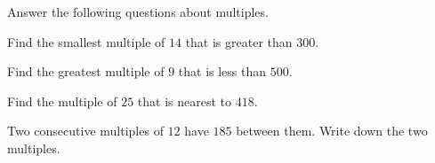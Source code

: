 Answer the following questions about multiples.
\begin{subparts}
  \item Find the smallest multiple of $14$ that is greater than $300$.
  \item Find the greatest multiple of $9$ that is less than $500$.
  \item Find the multiple of $25$ that is nearest to $418$.
  \item Two consecutive multiples of $12$ have $185$ between them. Write down the two multiples.
\end{subparts}
